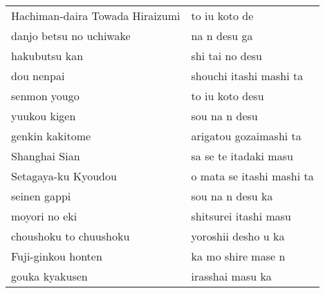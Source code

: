 \begin{table}[p]
\begin{center}
\begin{tabular}{p{6.5cm}|p{6.5cm}}
Hachiman-daira Towada Hiraizumi                 &  to iu koto de  \\
danjo betsu no uchiwake                         &  na n desu ga  \\
hakubutsu kan                                   &  shi tai no desu  \\
dou nenpai                                      &  shouchi itashi mashi ta  \\
senmon yougo                                    &  to iu koto desu  \\
yuukou kigen                                    &  sou na n desu  \\
genkin kakitome                                 &  arigatou gozaimashi ta  \\
Shanghai Sian                                   &  sa se te itadaki masu  \\
Setagaya-ku Kyoudou                             &  o mata se itashi mashi ta  \\
seinen gappi                                    &  sou na n desu ka  \\
moyori no eki                                   &  shitsurei itashi masu  \\
choushoku to chuushoku                          &  yoroshii desho u ka  \\
Fuji-ginkou honten                              &  ka mo shire mase n  \\
gouka kyakusen                                  &  irasshai masu ka  \\
\hline
\end{tabular}
\end{center}
\end{table}


